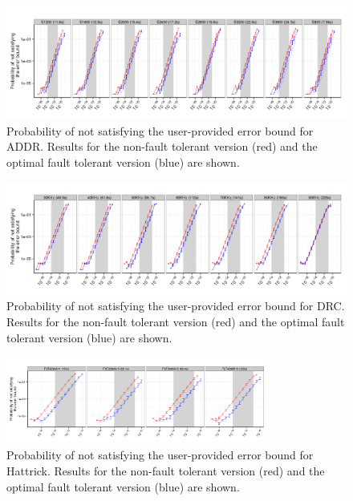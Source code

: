\documentclass{sig-alternate}
\begin{document}
\begin{figure}[ht!]
\centering
\includegraphics[width=7in]{figs/Lasso_Par_Seq_ImperfectRate_log.png}
\vspace{-10pt}
\caption{Probability of not satisfying the user-provided error bound for ADDR. Results for the non-fault tolerant version (red) and the optimal fault tolerant version (blue) are shown.}
\vspace{-10pt}
\label{fig:Lasso_ImperfectRate}
\end{figure}

\begin{figure}[ht!]
\centering
\includegraphics[width=7in]{figs/DRC_Par_Seq_ImperfectRate_log.png}
\vspace{-10pt}
\caption{Probability of not satisfying the user-provided error bound for DRC. Results for the non-fault tolerant version (red) and the optimal fault tolerant version (blue) are shown.}
\vspace{-10pt}
\label{fig:DRC_ImperfectRate}
\end{figure}

\begin{figure}[ht!]
\centering
\includegraphics[width=3.4in]{figs/Hattrick_Par_Seq_ImperfectRate_log.png}
\vspace{-10pt}
\caption{Probability of not satisfying the user-provided error bound for Hattrick. Results for the non-fault tolerant version (red) and the optimal fault tolerant version (blue) are shown.}
\vspace{-10pt}
\label{fig:Hattrick_ImperfectRate}
\end{figure}
\end{document}
